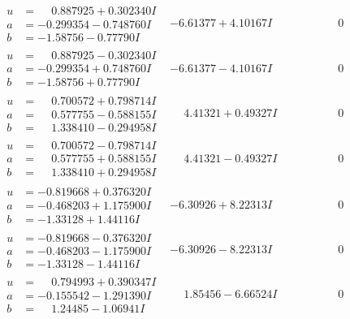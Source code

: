 \documentclass[1p]{elsarticle_modified}
\theoremstyle{definition}
\begin{document}
$$\begin{array}{c|c|c}
\begin{aligned}
u &= \phantom{-}0.887925 + 0.302340 I \\
a &= -0.299354 - 0.748760 I \\
b &= -1.58756 - 0.77790 I\end{aligned}
 & -6.61377 + 4.10167 I & \phantom{-0.000000 } 0 \\ \hline\begin{aligned}
u &= \phantom{-}0.887925 - 0.302340 I \\
a &= -0.299354 + 0.748760 I \\
b &= -1.58756 + 0.77790 I\end{aligned}
 & -6.61377 - 4.10167 I & \phantom{-0.000000 } 0 \\ \hline\begin{aligned}
u &= \phantom{-}0.700572 + 0.798714 I \\
a &= \phantom{-}0.577755 - 0.588155 I \\
b &= \phantom{-}1.338410 - 0.294958 I\end{aligned}
 & \phantom{-}4.41321 + 0.49327 I & \phantom{-0.000000 } 0 \\ \hline\begin{aligned}
u &= \phantom{-}0.700572 - 0.798714 I \\
a &= \phantom{-}0.577755 + 0.588155 I \\
b &= \phantom{-}1.338410 + 0.294958 I\end{aligned}
 & \phantom{-}4.41321 - 0.49327 I & \phantom{-0.000000 } 0 \\ \hline\begin{aligned}
u &= -0.819668 + 0.376320 I \\
a &= -0.468203 + 1.175900 I \\
b &= -1.33128 + 1.44116 I\end{aligned}
 & -6.30926 + 8.22313 I & \phantom{-0.000000 } 0 \\ \hline\begin{aligned}
u &= -0.819668 - 0.376320 I \\
a &= -0.468203 - 1.175900 I \\
b &= -1.33128 - 1.44116 I\end{aligned}
 & -6.30926 - 8.22313 I & \phantom{-0.000000 } 0 \\ \hline\begin{aligned}
u &= \phantom{-}0.794993 + 0.390347 I \\
a &= -0.155542 - 1.291390 I \\
b &= \phantom{-}1.24485 - 1.06941 I\end{aligned}
 & \phantom{-}1.85456 - 6.66524 I & \phantom{-0.000000 } 0 \\ \hline\begin{aligned}

\end{aligned}
\end{array}$$
\end{document}
